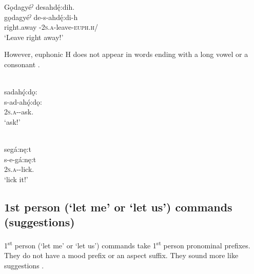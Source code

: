 
\ex Gǫdagyéˀ desahdę́:dih.\\
\gll gǫdagyéˀ de-s-ahdę́:di-h \\
right.away {\dualic}-\textsc{2s.a}-leave-\textsc{euph.h}/{\noaspect} \\
\glt `Leave right away!'

\z
\z

However, euphonic H does not appear in words ending with a long vowel  or a consonant .

\ea\label{ex:commandex4} {}\\
sadahǫ́:dǫ:\\
\gll s-ad-ahǫ́:dǫ:\\
 \textsc{2s.a}-{\semireflexive}-ask.{\noaspect} \\
\glt `ask!'

\z


\ea\label{ex:commandex5} {}\\
segá:nę:t\\
\gll s-e-gá:nę:t\\
 \textsc{2s.a}-{\joinerE}-lick.{\noaspect}\\
\glt `lick it!'

\z



\subsection{1st person (‘let me’ or ‘let us’) commands (suggestions)} \label{1st person (‘let me’ or ‘let us’) commands (suggestions)}
1\textsuperscript{st} person (‘let me’ or ‘let us’) commands take 1\textsuperscript{st} person pronominal prefixes. They do not have a mood prefix or an aspect suffix. They sound more like suggestions . 

